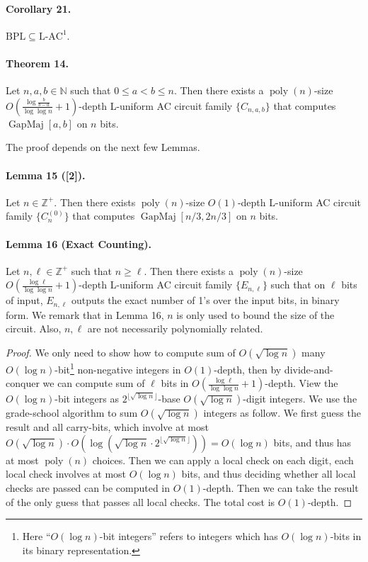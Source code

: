 \documentclass[10pt,a4paper]{article}
\begin{document}
\paragraph{Corollary 21.} $\mathrm{BPL}\subseteq\mathrm{L}\text{-}\mathrm{AC}^1$.

\paragraph{Theorem 14.} Let $n,a,b\in\mathbb N$ such that $0\le a<b\le n$. Then there exists a $\operatorname{poly}(n)$-size $O\left(\frac{\log\frac b{b-a}}{\log\log n}+1\right)$-depth L-uniform AC circuit family $\{C_{n,a,b}\}$ that computes $\operatorname{GapMaj}[a,b]$ on $n$ bits.

The proof depends on the next few Lemmas.
\paragraph{Lemma 15 ([2]).} Let $n\in\mathbb Z^+$. Then there exists $\operatorname{poly}(n)$-size $O(1)$-depth L-uniform AC circuit family $\{C_n^{(0)}\}$ that computes $\operatorname{GapMaj}[n/3,2n/3]$ on $n$ bits.
\paragraph{Lemma 16 (Exact Counting).} Let $n,\ell\in\mathbb Z^+$ such that $n\ge\ell$. Then there exists a $\operatorname{poly}(n)$-size $O\left(\frac{\log\ell}{\log\log n}+1\right)$-depth L-uniform AC circuit family $\{E_{n,\ell}\}$ such that on $\ell$ bits of input, $E_{n,\ell}$ outputs the exact number of 1's over the input bits, in binary form.
We remark that in Lemma 16, $n$ is only used to bound the size of the circuit. Also, $n,\ell$ are not necessarily polynomially related.
\begin{proof}
We only need to show how to compute sum of $O(\sqrt{\log n})$ many $O(\log n)$-bit\footnote{Here ``$O(\log n)$-bit integers'' refers to integers which has $O(\log n)$-bits in its binary representation.} non-negative integers in $O(1)$-depth, then by divide-and-conquer we can compute sum of $\ell$ bits in $O\left(\frac{\log\ell}{\log\log n}+1\right)$-depth.
View the $O(\log n)$-bit integers as $2^{\lfloor\sqrt{\log n}\rfloor}$-base $O(\sqrt{\log n})$-digit integers. We use the grade-school algorithm to sum $O(\sqrt{\log n})$ integers as follow. We first guess the result and all carry-bits, which involve at most $O(\sqrt{\log n})\cdot O\left(\log\left(\sqrt{\log n}\cdot2^{\lfloor\sqrt{\log n}\rfloor}\right)\right)=O(\log n)$ bits, and thus has at most $\operatorname{poly}(n)$ choices. Then we can apply a local check on each digit, each local check involves at most $O(\log n)$ bits, and thus deciding whether all local checks are passed can be computed in $O(1)$-depth. Then we can take the result of the only guess that passes all local checks. The total cost is $O(1)$-depth.
\end{proof}
\end{document}

